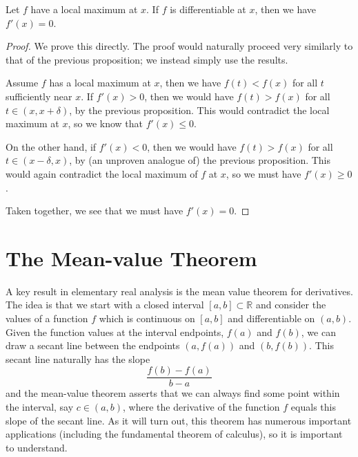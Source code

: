 \begin{prop}
Let $f$ have a local maximum at $x$. If $f$ is differentiable at $x$, then we have $f'\left(x\right)=0$.
\end{prop}
\begin{proof}
We prove this directly. The proof would naturally proceed very similarly to that of the previous proposition; we instead simply use the results.

Assume $f$ has a local maximum at $x$, then we have $f\left(t\right) < f\left(x\right)$ for all $t$ sufficiently near $x$. If $f'\left(x\right) >0$, then we would have $f\left(t\right)>f\left(x\right)$ for all $t\in\left(x,x+\delta\right)$, by the previous proposition. This would contradict the local maximum at $x$, so we know that $f'\left(x\right) \leq 0$.

On the other hand, if $f'\left(x\right) < 0$, then we would have $f\left(t\right) > f\left(x\right)$ for all $t\in\left(x-\delta,x\right)$, by (an unproven analogue of) the previous proposition. This would again contradict the local maximum of $f$ at $x$, so we must have $f'\left(x\right) \geq 0$.

Taken together, we see that we must have $f'\left(x\right) = 0$.
\end{proof}





\section{The Mean-value Theorem}
A key result in elementary real analysis is the mean value theorem for derivatives. The idea is that we start with a closed interval $\left[a,b\right]\subset \mathbb{R}$ and consider the values of a function $f$ which is continuous on $\left[a,b\right]$ and differentiable on $\left(a,b\right)$. Given the function values at the interval endpoints, $f\left(a\right)$ and $f\left(b\right)$, we can draw a secant line between the endpoints $\left(a,f\left(a\right)\right)$ and $\left(b,f\left(b\right)\right)$. This secant line naturally has the slope $$ \frac{f\left(b\right)-f\left(a\right)}{b-a} $$ and the mean-value theorem asserts that we can always find some point within the interval, say $c\in \left(a,b\right)$, where the derivative of the function $f$ equals this slope of the secant line. As it will turn out, this theorem has numerous important applications (including the fundamental theorem of calculus), so it is important to understand.

